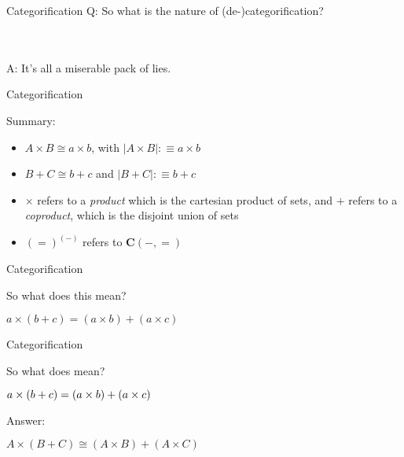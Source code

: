 \documentclass[tikz]{beamer}
\theoremstyle{definition}
\begin{document}
\begin{frame}{Categorification}
    Q: So what is the nature of (de-)categorification? 
    
    \\
    
    \\A: It's all a miserable pack of lies.
\end{frame}{}

\begin{frame}{Categorification}

Summary: 

\begin{block}{}
\begin{itemize}
    \item $A \times B \cong a \times b$, with $|A \times B| :\equiv a \times b$
    \item $B + C \cong b + c$ and $|B + C| :\equiv b + c$
    \item $\times$ refers to a \textit{product} which is the cartesian product of sets, and $+$ refers to a \textit{coproduct}, which is the disjoint union of sets
    \item $(=)^{(-)}$ refers to $\mathbf{C}(-,=)$
\end{itemize}{}

\end{block}
\end{frame}{}

\begin{frame}{Categorification}
    
    So what does this mean?
    
    \begin{block}{}
        $a \times (b + c) = (a \times b) + (a \times c) $
    \end{block}{}
\end{frame}{}

\begin{frame}{Categorification}
    
    So what does mean?
    
    \begin{block}{}
        $a \times (b + c) = (a \times b) + (a \times c) 
        \\$
    \end{block}{}
 
 Answer:

\begin{block}{}
    $A \times (B + C) \cong (A \times B) + (A \times C)$
\end{block}{}
 
\end{frame}{}
\end{document}
